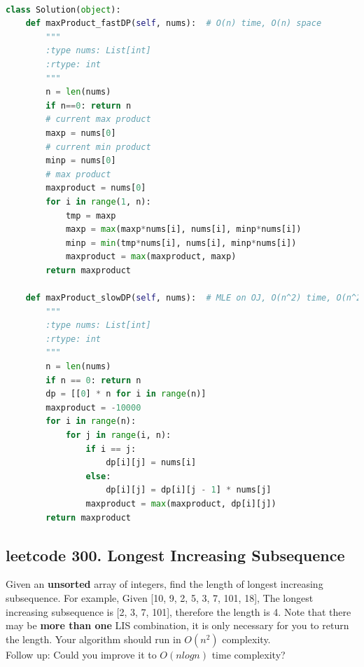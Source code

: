 \documentclass[a4paper,10pt]{article}
\begin{document}
\begin{lstlisting}[language=Python, caption=Problem152. Maximum Product Subarray]

class Solution(object):
    def maxProduct_fastDP(self, nums):  # O(n) time, O(n) space
        """
        :type nums: List[int]
        :rtype: int
        """
        n = len(nums)
        if n==0: return n
        # current max product
        maxp = nums[0]
        # current min product
        minp = nums[0]
        # max product
        maxproduct = nums[0]
        for i in range(1, n):
            tmp = maxp
            maxp = max(maxp*nums[i], nums[i], minp*nums[i])
            minp = min(tmp*nums[i], nums[i], minp*nums[i])
            maxproduct = max(maxproduct, maxp)
        return maxproduct

    def maxProduct_slowDP(self, nums):  # MLE on OJ, O(n^2) time, O(n^2) space
        """
        :type nums: List[int]
        :rtype: int
        """
        n = len(nums)
        if n == 0: return n
        dp = [[0] * n for i in range(n)]
        maxproduct = -10000
        for i in range(n):
            for j in range(i, n):
                if i == j:
                    dp[i][j] = nums[i]
                else:
                    dp[i][j] = dp[i][j - 1] * nums[j]
                maxproduct = max(maxproduct, dp[i][j])
        return maxproduct
\end{lstlisting}




\subsection{leetcode 300. Longest Increasing Subsequence}
Given an \textbf{unsorted} array of integers, find the length of longest increasing subsequence. For example, Given [10, 9, 2, 5, 3, 7, 101, 18], The longest increasing subsequence is [2, 3, 7, 101], therefore the length is 4. Note that there may be \textbf{more than one} LIS combination, it is only necessary for you to return the length. Your algorithm should run in $O(n^2)$ complexity. \\

\noindent Follow up: Could you improve it to $O(nlogn)$ time complexity? \\
\end{document}
